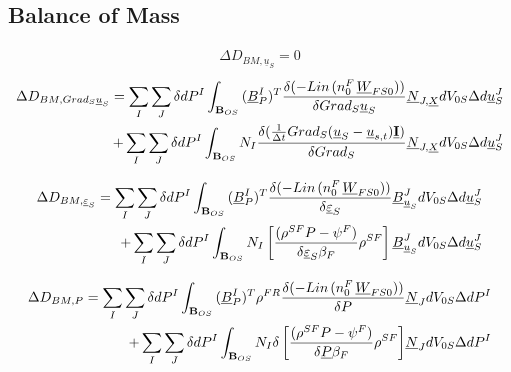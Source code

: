 \documentclass[12pt]{article}
\begin{document}
	\newpage
	\subsection{Balance of Mass}
	\begin{equation*}
		\begin{aligned}
			\Delta D_{BM, \underline{u}_{S}} = 0
		\end{aligned}
	\end{equation*}
	\begin{equation*}
		\begin{aligned}
			\Delta D_{BM, {Grad_{S}}\underline{u}_{S}} = \sum_{I}\sum_{J}{\delta dP^{I}}\int_{\mathbf{B}_{OS}}{{(\underline{B}_{P}^{I})^{T}}}{\frac{\delta (-Lin\hspace{0.5mm} ({n_{0}^{F}}\hspace{0.5mm}{\underline{W}_{FS0}}))}{\delta {Grad_{S}}\underline{u}_{S} }}{\underline{N}_{{J},{\underline{X}}}}{dV_{0S}}{\Delta d\underline{u}_{S}^{J}} \\ +
			\sum_{I}\sum_{J}{\delta dP^{I}}\int_{\mathbf{B}_{OS}}{{N_{I}}}{\frac{\delta ({\frac{1}{\Delta t}}{Grad_{S}{({\underline{u}_{S}}-{\underline{u}_{s,t}})}}{\underline{\mathbf{I}}})}{\delta {Grad_{S}}}}{\underline{N}_{{J},{\underline{X}}}}{dV_{0S}}{\Delta d\underline{u}_{S}^{J}}
		\end{aligned}
	\end{equation*}
	
	\begin{equation*}
		\begin{aligned}
			\Delta D_{BM,  \underline{\varepsilon}_{S}}=\sum_{I}\sum_{J}{\delta dP^{I}}\int_{\mathbf{B}_{OS}}{{(\underline{B}_{P}^{I})^{T}}}{\frac{\delta (-Lin\hspace{0.5mm} ({n_{0}^{F}}\hspace{0.5mm}{\underline{W}_{FS0}}))}{\delta \underline{\varepsilon}_{S} }}{\underline{B}_{\underline{u}_{S}}^{J}}{dV_{0S}}{\Delta d\underline{u}_{S}^{J}}\\ + \sum_{I}\sum_{J}{\delta dP^{I}}\int_{\mathbf{B}_{OS}}{N_{I}}\left[{\frac{({\rho^{SF}}{P}-{\psi^F})}{{\delta \underline{\varepsilon}_{S} }\beta_{F}}}{\rho^{SF}}\right]{\underline{B}_{\underline{u}_{S}}^{J}}{dV_{0S}}{\Delta d\underline{u}_{S}^{J}}
		\end{aligned}    
	\end{equation*}
	
	\begin{equation*}
		\begin{aligned}
			\Delta D_{BM,P}=\sum_{I}\sum_{J}{\delta dP^{I}}\int_{\mathbf{B}_{OS}}{{(\underline{B}_{P}^{I})^{T}}{\rho^{FR}}}{\frac{\delta (-Lin\hspace{0.5mm} ({n_{0}^{F}}\hspace{0.5mm}{\underline{W}_{FS0}}))}{\delta P }}{\underline{N}_{J}}{dV_{0S}}{\Delta dP^{I}}\\ + \sum_{I}\sum_{J}{\delta dP^{I}}\int_{\mathbf{B}_{OS}}{N_{I}}{\delta\left[{\frac{({\rho^{SF}}{P}-{\psi^F})}{{\delta \underline{P} }\beta_{F}}}{\rho^{SF}}\right]}{{\underline{N}_{J}}}{dV_{0S}}{\Delta dP^{I}}			
		\end{aligned}    
	\end{equation*}
	
\end{document}
